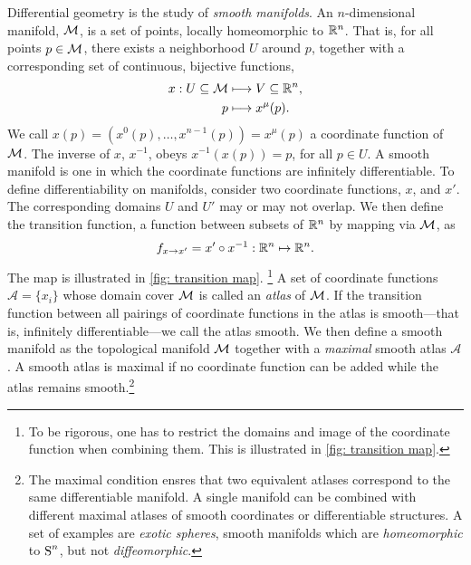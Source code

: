 Differential geometry is the study of \emph{smooth manifolds}.
An $n$-dimensional manifold, $\mathcal{M}$, is a set of points, locally homeomorphic to $\mathbb{R}^n$.
That is, for all points $p \in \mathcal{M}$, there exists a neighborhood $U$ around $p$, together with a corresponding set of continuous, bijective functions,
%
\begin{align}
    x: U \subseteq \mathcal{M} & \longmapsto V \subseteq \mathbb{R}^n, \\
    p & \longmapsto x^\mu(p).
\end{align}
%
We call $x(p) = (x^0(p), \dots, x^{n- 1}(p)) = x^\mu(p)$ a coordinate function of $\mathcal{M}$.
The inverse of $x$, $x^{-1}$, obeys $x^{-1}(x(p)) = p$, for all $p \in U$.
A smooth manifold is one in which the coordinate functions are infinitely differentiable.
To define differentiability on manifolds, consider two coordinate functions, $x$, and $x'$.
The corresponding domains $U$ and $U'$ may or may not overlap.
We then define the transition function, a function between subsets of $\mathbb{R}^n$ by mapping via $\mathcal{M}$, as
%
\begin{align}
    f_{x\rightarrow x'} = x' \circ x^{-1} : \mathbb{R}^n \mapsto \mathbb{R}^n.
\end{align}
%
The map is illustrated in \autoref{fig: transition map}.
\footnote{To be rigorous, one has to restrict the domains and image of the coordinate function when combining them. This is illustrated in \autoref{fig: transition map}.}
A set of coordinate functions $\mathcal A = \{x_i\}$ whose domain cover $\mathcal{M}$ is called an \emph{atlas} of $\mathcal{M}$.
If the transition function between all pairings of coordinate functions in the atlas is smooth---that is, infinitely differentiable---we call the atlas smooth.
We then define a smooth manifold as the topological manifold $\mathcal{M}$ together with a \emph{maximal} smooth atlas $\mathcal A$.
A smooth atlas is maximal if no coordinate function can be added while the atlas remains smooth.\footnote{%
    The maximal condition ensres that two equivalent atlases correspond to the same differentiable manifold. A single manifold can be combined with different maximal atlases of smooth coordinates or differentiable structures. A set of examples are \emph{exotic spheres}, smooth manifolds which are \emph{homeomorphic} to $\text S^n$, but not \emph{diffeomorphic}. 
    }
%
